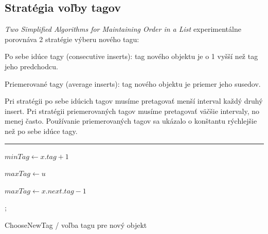 \documentclass[
  digital,     %
  oneside,     %
  nosansbold,  %
  nocolorbold, %
  lof,         %
  lot,         %
]{fithesis4}
\begin{document}
\subsection*{Stratégia voľby tagov}

\textit{Two Simplified Algorithms for Maintaining Order in a List} \cite{paper1_ordered_list} experimentálne porovnáva 2 stratégie výberu nového tagu:
\begin{compactenum}
  \item Po sebe idúce tagy (consecutive inserts): tag nového objektu je o 1 vyšší než tag jeho predchodcu.
  \item Priemerované tagy (average inserts): tag nového objektu je priemer jeho susedov.
\end{compactenum}
Pri stratégii po sebe idúcich tagov musíme pretagovať menší interval každý druhý insert. Pri stratégii priemerovaných tagov musíme pretagovať väčšie intervaly, no menej často. Používanie priemerovaných tagov sa ukázalo o konštantu rýchlejšie než po sebe idúce tagy.

\begin{algorithm}
\hrule\vspace{0.2em}
$minTag \leftarrow x.tag + 1$\;

$maxTag \leftarrow u$\;

{
    $maxTag \leftarrow x.next.tag - 1$\;
}

; 
\caption{ChooseNewTag / voľba tagu pre nový objekt  }
\end{algorithm}
\end{document}
